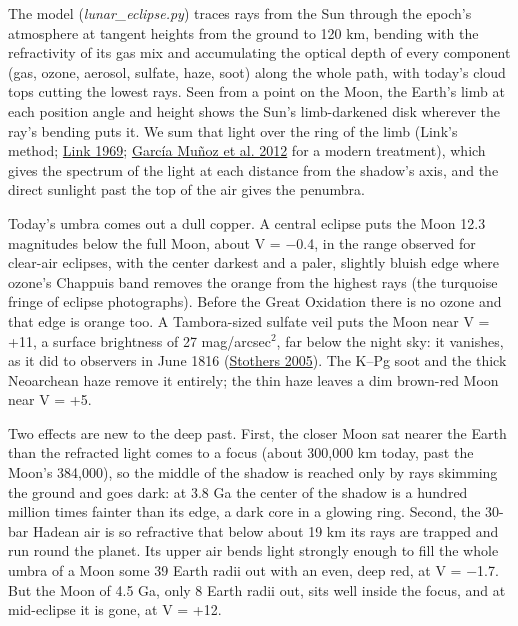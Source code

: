 \documentclass[9pt,twocolumn]{extarticle}
\begin{document}
The model (\emph{lunar\_eclipse.py}) traces rays from the Sun through the epoch's atmosphere at tangent heights from the ground to 120 km, bending with the refractivity of its gas mix and accumulating the optical depth of every component (gas, ozone, aerosol, sulfate, haze, soot) along the whole path, with today's cloud tops cutting the lowest rays. Seen from a point on the Moon, the Earth's limb at each position angle and height shows the Sun's limb-darkened disk wherever the ray's bending puts it. We sum that light over the ring of the limb (Link's method; \protect\hyperlink{cite.link1969}{Link 1969}; \protect\hyperlink{cite.garciamunoz2012}{García Muñoz et al. 2012} for a modern treatment), which gives the spectrum of the light at each distance from the shadow's axis, and the direct sunlight past the top of the air gives the penumbra.

Today's umbra comes out a dull copper. A central eclipse puts the Moon 12.3 magnitudes below the full Moon, about V = $-$0.4, in the range observed for clear-air eclipses, with the center darkest and a paler, slightly bluish edge where ozone's Chappuis band removes the orange from the highest rays (the turquoise fringe of eclipse photographs). Before the Great Oxidation there is no ozone and that edge is orange too. A Tambora-sized sulfate veil puts the Moon near V = +11, a surface brightness of 27 mag/arcsec$^{2}$, far below the night sky: it vanishes, as it did to observers in June 1816 (\protect\hyperlink{cite.stothers2005}{Stothers 2005}). The K--Pg soot and the thick Neoarchean haze remove it entirely; the thin haze leaves a dim brown-red Moon near V = +5.

Two effects are new to the deep past. First, the closer Moon sat nearer the Earth than the refracted light comes to a focus (about 300,000 km today, past the Moon's 384,000), so the middle of the shadow is reached only by rays skimming the ground and goes dark: at 3.8 Ga the center of the shadow is a hundred million times fainter than its edge, a dark core in a glowing ring. Second, the 30-bar Hadean air is so refractive that below about 19 km its rays are trapped and run round the planet. Its upper air bends light strongly enough to fill the whole umbra of a Moon some 39 Earth radii out with an even, deep red, at V = $-$1.7. But the Moon of 4.5 Ga, only 8 Earth radii out, sits well inside the focus, and at mid-eclipse it is gone, at V = +12.
\end{document}
